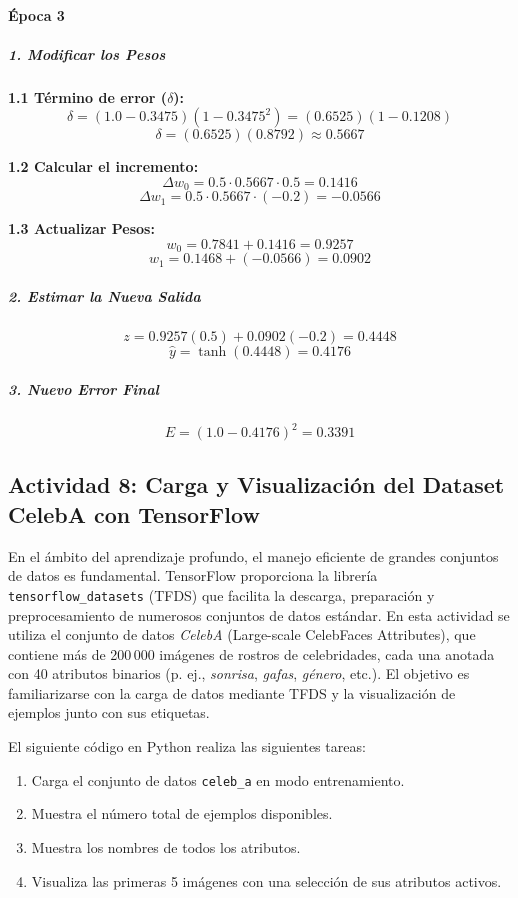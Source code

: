 \documentclass[12pt]{article}
\begin{document}
\paragraph{Época 3}

\subparagraph{1. Modificar los Pesos}
\textbf{1.1 Término de error ($\delta$):}
\[ \delta = (1.0 - 0.3475)(1 - 0.3475^2) = (0.6525)(1 - 0.1208) \]
\[ \delta = (0.6525)(0.8792) \approx 0.5667 \]

\textbf{1.2 Calcular el incremento:}
\[ \Delta w_{0} = 0.5 \cdot 0.5667 \cdot 0.5 = 0.1416 \]
\[ \Delta w_{1} = 0.5 \cdot 0.5667 \cdot (-0.2) = -0.0566 \]

\textbf{1.3 Actualizar Pesos:}
\[ w_{0} = 0.7841 + 0.1416 = 0.9257 \]
\[ w_{1} = 0.1468 + (-0.0566) = 0.0902 \]

\subparagraph{2. Estimar la Nueva Salida}
\[ z = 0.9257(0.5) + 0.0902(-0.2) = 0.4448 \]
\[ \hat{y} = \tanh(0.4448) = 0.4176 \]

\subparagraph{3. Nuevo Error Final}
\[ E = (1.0 - 0.4176)^2 = 0.3391 \]

\subsection{Actividad 8: Carga y Visualización del Dataset CelebA con TensorFlow}

En el ámbito del aprendizaje profundo, el manejo eficiente de grandes conjuntos de datos es fundamental. TensorFlow proporciona la librería \texttt{tensorflow\_datasets} (TFDS) que facilita la descarga, preparación y preprocesamiento de numerosos conjuntos de datos estándar. En esta actividad se utiliza el conjunto de datos \textit{CelebA} (Large-scale CelebFaces Attributes), que contiene más de 200\,000 imágenes de rostros de celebridades, cada una anotada con 40 atributos binarios (p. ej., \textit{sonrisa}, \textit{gafas}, \textit{género}, etc.). El objetivo es familiarizarse con la carga de datos mediante TFDS y la visualización de ejemplos junto con sus etiquetas.

El siguiente código en Python realiza las siguientes tareas:
\begin{enumerate}
    \item Carga el conjunto de datos \texttt{celeb\_a} en modo entrenamiento.
    \item Muestra el número total de ejemplos disponibles.
    \item Muestra los nombres de todos los atributos.
    \item Visualiza las primeras 5 imágenes con una selección de sus atributos activos.
\end{enumerate}
\end{document}
